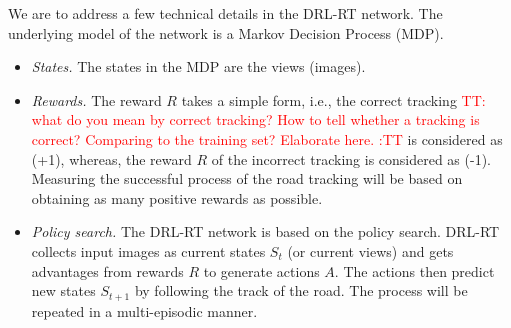 \documentclass{svproc}
\renewcommand{\tt}[1]{\textcolor{red} {TT: #1 :TT} }
\begin{document}
We are to address a few technical details in the DRL-RT network. The underlying model of the network is a Markov Decision Process (MDP). 
\begin{itemize}
	\item \emph{States.} The states in the MDP are the views (images).  
	\item \emph{Rewards.} The reward $R$ takes a simple form, i.e., the correct tracking 	\tt{what do you mean by correct tracking? How to tell whether a tracking is correct? Comparing to the training set? Elaborate here.} is considered as (+1), whereas, the reward $R$ of the incorrect tracking is considered as (-1). Measuring the successful process of the road tracking will be based on obtaining as many positive rewards as possible. 

	
	\item \emph{Policy search.} The DRL-RT network is based on the policy search. %
	DRL-RT collects input images as current states $S_t$ (or current views) and gets advantages from rewards $R$ to generate actions $A$. The actions then predict new states $S_{t+1}$ by following the track of the road. The process will be repeated in a multi-episodic manner.

\end{itemize}
 
\end{document}
